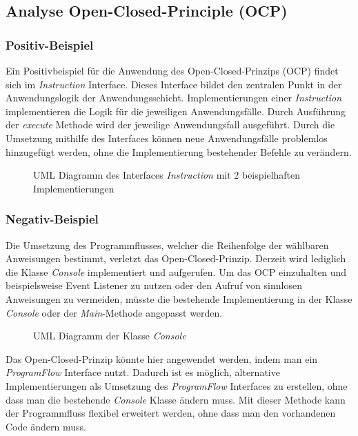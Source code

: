 \subsection{Analyse Open-Closed-Principle (OCP)}

\subsubsection{Positiv-Beispiel}

Ein Positivbeispiel für die Anwendung des Open-Closed-Prinzips (OCP) findet sich im \textit{Instruction} Interface. Dieses Interface bildet den zentralen Punkt in der Anwendungslogik der Anwendungsschicht.
Implementierungen einer \textit{Instruction} implementieren die Logik für die jeweiligen Anwendungsfälle.
Durch Ausführung der \textit{execute} Methode wird der jeweilige Anwendungsfall ausgeführt.
Durch die Umsetzung mithilfe des Interfaces können neue Anwendungsfälle problemlos hinzugefügt werden, ohne die Implementierung bestehender Befehle zu verändern.

\begin{figure}[H]
  \centering
  
  \caption{UML Diagramm des Interfaces \textit{Instruction} mit 2 beispielhaften Implementierungen}
\end{figure}

\subsubsection{Negativ-Beispiel}

Die Umsetzung des Programmflusses, welcher die Reihenfolge der wählbaren Anweisungen bestimmt, verletzt das Open-Closed-Prinzip. Derzeit wird lediglich die Klasse \textit{Console} implementiert und aufgerufen. Um das OCP einzuhalten und beispielsweise Event Listener zu nutzen oder den Aufruf von sinnlosen Anweisungen zu vermeiden, müsste die bestehende Implementierung in der Klasse \textit{Console} oder der \textit{Main}-Methode angepasst werden.

\begin{figure}[H]
  \centering
  
  \caption{UML Diagramm der Klasse \textit{Console}}
\end{figure}


Das Open-Closed-Prinzip könnte hier angewendet werden, indem man ein \textit{ProgramFlow} Interface nutzt. Dadurch ist es möglich, alternative Implementierungen als Umsetzung des \textit{ProgramFlow} Interfaces zu erstellen, ohne dass man die bestehende \textit{Console} Klasse ändern muss. Mit dieser Methode kann der Programmfluss flexibel erweitert werden, ohne dass man den vorhandenen Code ändern muss.

